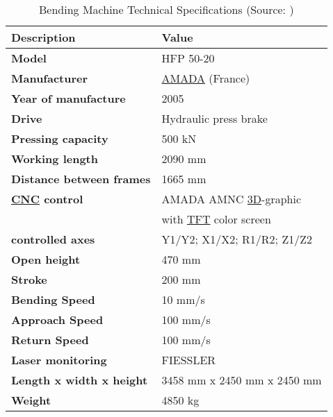 \begin{table}[h!]
    \centering
    \begin{tabular}{ll}
        {\textbf{Description}} & {\textbf{Value}} \\
        \hline
        \textbf{Model} & HFP 50-20 \\
        \textbf{Manufacturer} & \hyperref[acro:AMADA]{AMADA} (France) \\
        \textbf{Year of manufacture} & 2005 \\
        \textbf{Drive} & Hydraulic press brake \\
        \textbf{Pressing capacity} & 500 kN \\
        \textbf{Working length} & 2090 mm \\
        \textbf{Distance between frames} & 1665 mm \\
        \textbf{\hyperref[acro:CNC]{CNC} control} & AMADA AMNC \hyperref[acro:3D]{3D}-graphic \\
        & with \hyperref[acro:TFT]{TFT} color screen \\
        \textbf{controlled axes} &  Y1/Y2; X1/X2; R1/R2; Z1/Z2 \\
        \textbf{Open height} & 470 mm \\
        \textbf{Stroke} & 200 mm \\
        \textbf{Bending Speed} & 10 mm/s \\
        \textbf{Approach Speed} & 100 mm/s \\
        \textbf{Return Speed} & 100 mm/s \\
        \textbf{Laser monitoring} & FIESSLER \\
        \textbf{Length x width x height} & 3458 mm x 2450 mm x 2450 mm \\
        \textbf{Weight} & 4850 kg \\ \hline
    \end{tabular}
    \caption{Bending Machine Technical Specifications (Source: \cite{bmspecifications})}
    \label{tab:machine_specifications}
\end{table}

